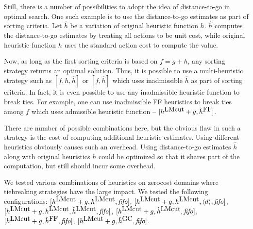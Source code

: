 Still, there is a number of possibilities to adopt the idea of
distance-to-go in optimal search. One such example is to use the
distance-to-go estimates as part of sorting criteria.
% 
Let $\hat{h}$ be a variation of original heuristic function
$h$. $\hat{h}$ computes the distance-to-go estimates by treating all
actions to be unit cost, while original heuristic function $h$ uses the
standard action cost to compute the value.

Now, as long as the first sorting criteria is based on $f=g+h$, any
sorting strategy returns an optimal solution. Thus, it is possible to
use a multi-heuristic strategy such as $[f,h,\hat{h}]$ or $[f,\hat{h}]$
which uses inadmissible $\hat{h}$ as part of sorting criteria.
In fact, it is even possible to use any inadmissible heuristic function to break
ties. For example, one can use inadmissible FF heuristics to break ties
among $f$ which uses admissible \lmcut heuristic function -- $[h^{\mbox{LMcut}}+g,\hat{h}^{\mbox{FF}}]$.

There are number of possible combinations here, but the obvious flaw in
such a strategy is the cost of computing additional heuristic
estimates. Using different heuristics obviously causes such an
overhead. Using distance-to-go estimates $\hat{h}$ along with original
heuristics $h$ could be optimized so that it shares part of the
computation, but still should incur some overhead.

We tested various combinations of heuristics on zerocost domains where
tiebreaking strategies have the large impact.
We tested the following configurations:
$[h^{\mbox{LMcut}}+g,h^{\mbox{LMcut}},{\mbox{\textit{fifo}}}]$, 
$[h^{\mbox{LMcut}}+g,h^{\mbox{LMcut}},{\left<d\right>},{\mbox{\textit{fifo}}}]$, 
$[h^{\mbox{LMcut}}+g,h^{\mbox{LMcut}},\hat{h}^{\mbox{LMcut}},{\mbox{\textit{fifo}}}]$, 
$[h^{\mbox{LMcut}}+g,\hat{h}^{\mbox{LMcut}},{\mbox{\textit{fifo}}}]$, 
$[h^{\mbox{LMcut}}+g,\hat{h}^{\mbox{FF}},{\mbox{\textit{fifo}}}]$,
$[h^{\mbox{LMcut}}+g,\hat{h}^{\mbox{GC}},{\mbox{\textit{fifo}}}]$.

